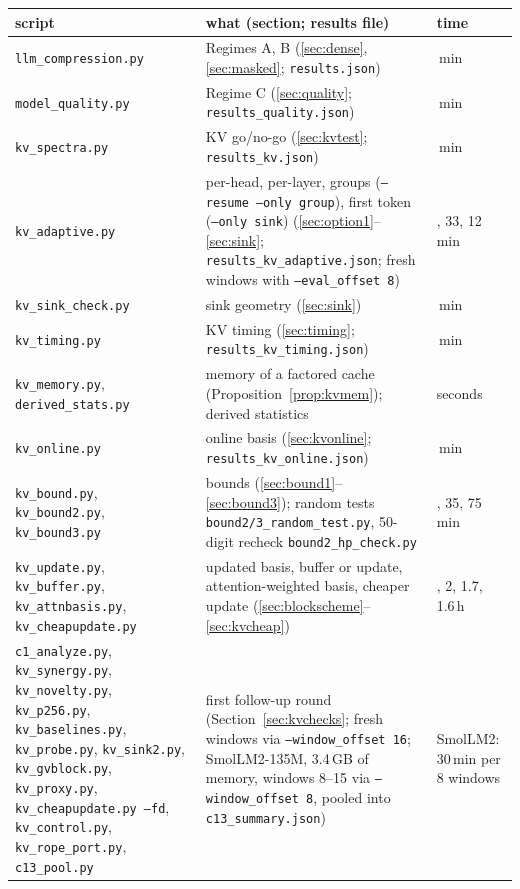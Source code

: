 \documentclass[10pt]{article}
\theoremstyle{plain}
\theoremstyle{definition}
\theoremstyle{remark}
\begin{document}
\begin{table}[!htb]
\centering\footnotesize
\begin{tabularx}{\textwidth}{@{}>{\raggedright}p{4.6cm} >{\raggedright}X >{\raggedright\arraybackslash}p{1.6cm}@{}}
\toprule
\textbf{script} & \textbf{what (section; results file)} & \textbf{time}\\
\midrule
\texttt{llm\_compression.py} & Regimes A, B (\ref{sec:dense}, \ref{sec:masked}; \texttt{results.json}) & 70\,min\\
\texttt{model\_quality.py} & Regime C (\ref{sec:quality}; \texttt{results\_quality.json}) & 25\,min\\
\texttt{kv\_spectra.py} & KV go/no-go (\ref{sec:kvtest}; \texttt{results\_kv.json}) & 8\,min\\
\texttt{kv\_adaptive.py} & per-head, per-layer, groups (\texttt{--resume --only group}), first token (\texttt{--only sink}) (\ref{sec:option1}--\ref{sec:sink}; \texttt{results\_kv\_adaptive.json}; fresh windows with \texttt{--eval\_offset 8}) & 30, 33, 12\,min\\
\texttt{kv\_sink\_check.py} & sink geometry (\ref{sec:sink}) & 3\,min\\
\texttt{kv\_timing.py} & KV timing (\ref{sec:timing}; \texttt{results\_kv\_timing.json}) & 4\,min\\
\texttt{kv\_memory.py}, \texttt{derived\_stats.py} & memory of a factored cache (Proposition~\ref{prop:kvmem}); derived statistics & seconds\\
\texttt{kv\_online.py} & online basis (\ref{sec:kvonline}; \texttt{results\_kv\_online.json}) & 40\,min\\
\texttt{kv\_bound.py}, \texttt{kv\_bound2.py}, \texttt{kv\_bound3.py} & bounds (\ref{sec:bound1}--\ref{sec:bound3}); random tests \texttt{bound2/3\_random\_test.py}, 50-digit recheck \texttt{bound2\_hp\_check.py} & 35, 35, 75\,min\\
\texttt{kv\_update.py}, \texttt{kv\_buffer.py}, \texttt{kv\_attnbasis.py}, \texttt{kv\_cheapupdate.py} & updated basis, buffer or update, attention-weighted basis, cheaper update (\ref{sec:blockscheme}--\ref{sec:kvcheap}) & 2, 2, 1.7, 1.6\,h\\
\texttt{c1\_analyze.py}, \texttt{kv\_synergy.py}, \texttt{kv\_novelty.py}, \texttt{kv\_p256.py}, \texttt{kv\_baselines.py}, \texttt{kv\_probe.py}, \texttt{kv\_sink2.py}, \texttt{kv\_gvblock.py}, \texttt{kv\_proxy.py}, \texttt{kv\_cheapupdate.py --fd}, \texttt{kv\_control.py}, \texttt{kv\_rope\_port.py}, \texttt{c13\_pool.py} & first follow-up round (Section~\ref{sec:kvchecks}; fresh windows via \texttt{--window\_offset 16}; SmolLM2-135M, 3.4\,GB of memory, windows 8--15 via \texttt{--window\_offset 8}, pooled into \texttt{c13\_summary.json}) & SmolLM2: 30\,min per 8 windows\\

\end{tabularx}
\end{table}
\end{document}
